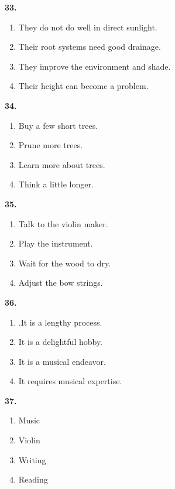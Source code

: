 \documentclass[12pt]{article}
\begin{document}
\par
\vspace{0.25\baselineskip}
\noindent\textbf{33.}
\begin{enumerate}[label=(\Alph*),leftmargin=*,itemsep=0.2em]
\item They do not do well in direct sunlight.
\item Their root systems need good drainage.
\item They improve the environment and shade.
\item Their height can become a problem.
\end{enumerate}
\par
\vspace{0.25\baselineskip}
\noindent\textbf{34.}
\begin{enumerate}[label=(\Alph*),leftmargin=*,itemsep=0.2em]
\item Buy a few short trees.
\item Prune more trees.
\item Learn more about trees.
\item Think a little longer.
\end{enumerate}
\par
\vspace{0.25\baselineskip}
\noindent\textbf{35.}
\begin{enumerate}[label=(\Alph*),leftmargin=*,itemsep=0.2em]
\item Talk to the violin maker.
\item Play the instrument.
\item Wait for the wood to dry.
\item Adjust the bow strings.
\end{enumerate}
\par
\vspace{0.25\baselineskip}
\noindent\textbf{36.}
\begin{enumerate}[label=(\Alph*),leftmargin=*,itemsep=0.2em]
\item .It is a lengthy process.
\item It is a delightful hobby.
\item It is a musical endeavor.
\item It requires musical expertise.
\end{enumerate}
\par
\vspace{0.25\baselineskip}
\noindent\textbf{37.}
\begin{enumerate}[label=(\Alph*),leftmargin=*,itemsep=0.2em]
\item Music
\item Violin
\item Writing
\item Reading
\end{enumerate}
\end{document}
